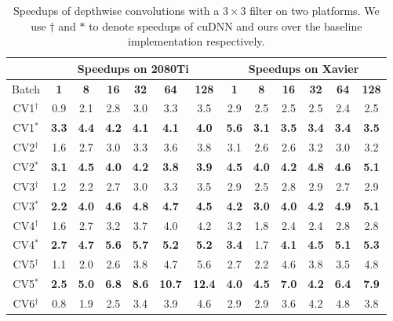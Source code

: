 \begin{table}[]
\setlength{\tabcolsep}{3.8pt}
\caption{Speedups of depthwise convolutions with a $3 \times 3$ filter on two platforms. We use ${\dag}$ and ${*}$ to denote speedups of cuDNN and ours over the baseline implementation respectively.}
\label{tab:dwconvf3}
\begin{threeparttable}
\begin{tabular}{c|cccccc|cccccc}
\toprule
&\multicolumn{6}{c|}{Speedups on 2080Ti} & \multicolumn{6}{c}{Speedups on Xavier}\\

\midrule
Batch& \textbf{1} & \textbf{8} & \textbf{16}& \textbf{32} & \textbf{64} & \textbf{128} & \textbf{1} & \textbf{8} & \textbf{16}& \textbf{32} & \textbf{64} & \textbf{128}\\
\hline
CV1$^{\dag}$&0.9 &2.1 &2.8 &3.0 &3.3 &3.5 &2.9 &2.5 &2.5 &2.5 &2.4 &2.5 \\CV1$^{*}$&\textbf{3.3} &\textbf{4.4} &\textbf{4.2} &\textbf{4.1} &\textbf{4.1} &\textbf{4.0} &\textbf{5.6} &\textbf{3.1} &\textbf{3.5} &\textbf{3.4} &\textbf{3.4} &\textbf{3.5} \\
\hline
CV2$^{\dag}$&1.6 &2.7 &3.0 &3.3 &3.6 &3.8 &3.1 &2.6 &2.6 &3.2 &3.0 &3.2 \\
CV2$^{*}$&\textbf{3.1} &\textbf{4.5} &\textbf{4.0} &\textbf{4.2} &\textbf{3.8} &\textbf{3.9} &\textbf{4.5} &\textbf{4.0} &\textbf{4.2} &\textbf{4.8} &\textbf{4.6} &\textbf{5.1} \\
\hline
CV3$^{\dag}$&1.2 &2.2 &2.7 &3.0 &3.3 &3.5 &2.9 &2.5 &2.8 &2.9 &2.7 &2.9 \\
CV3$^{*}$&\textbf{2.2} &\textbf{4.0} &\textbf{4.6} &\textbf{4.8} &\textbf{4.7} &\textbf{4.5} &\textbf{4.2} &\textbf{3.0} &\textbf{4.0} &\textbf{4.2} &\textbf{4.9} &\textbf{5.1} \\
\hline
CV4$^{\dag}$&1.6 &2.7 &3.2 &3.7 &4.0 &4.2 &3.2 &1.8 &2.4 &2.4 &2.8 &2.8 \\
CV4$^{*}$&\textbf{2.7} &\textbf{4.7} &\textbf{5.6} &\textbf{5.7} &\textbf{5.2} &\textbf{5.2} &\textbf{3.4} &1.7 &\textbf{4.1} &\textbf{4.5} &\textbf{5.1} &\textbf{5.3} \\
\hline
CV5$^{\dag}$&1.1 &2.0 &2.6 &3.8 &4.7 &5.6 &2.7 &2.2 &4.6 &3.8 &3.5 &4.8 \\
CV5$^{*}$&\textbf{2.5} &\textbf{5.0} &\textbf{6.8} &\textbf{8.6} &\textbf{10.7} &\textbf{12.4} &\textbf{4.0} &\textbf{4.5} &\textbf{7.0} &\textbf{4.2} &\textbf{6.4} &\textbf{7.9} \\
\hline
CV6$^{\dag}$&0.8 &1.9 &2.5 &3.4 &3.9 &4.6 &2.9 &2.9 &3.6 &4.2 &4.8 &3.8 \\

\end{tabular}
\end{threeparttable}
\end{table}
